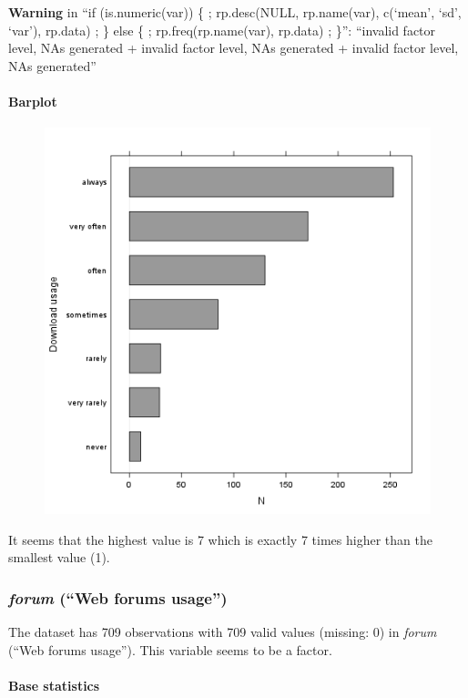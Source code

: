 \documentclass{article}
\makeatletter
\def\maxwidth{\ifdim\Gin@nat@width>\linewidth\linewidth
\else\Gin@nat@width\fi}
\let\Oldincludegraphics\includegraphics
\renewcommand{\includegraphics}[1]{\Oldincludegraphics[width=\maxwidth]{#1}}
\makeatother
\begin{document}
\textbf{Warning} in ``if (is.numeric(var)) \{ ; rp.desc(NULL,
rp.name(var), c(`mean', `sd', `var'), rp.data) ; \} else \{ ;
rp.freq(rp.name(var), rp.data) ; \}'': ``invalid factor level, NAs
generated + invalid factor level, NAs generated + invalid factor level,
NAs generated''

\paragraph{Barplot}

\begin{figure}[htbp]
\centering
\includegraphics{ec8a2289e719ec679a4abc2f1b3a62ec.png}
\caption{}
\end{figure}

It seems that the highest value is 7 which is exactly 7 times higher
than the smallest value (1).

\subsubsection{\emph{forum} (``Web forums usage'')}

The dataset has 709 observations with 709 valid values (missing: 0) in
\emph{forum} (``Web forums usage''). This variable seems to be a factor.

\paragraph{Base statistics}
\end{document}
